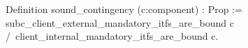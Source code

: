 Definition sound_contingency (c:component) : Prop := 
       subc_client_external_mandatory_itfs_are_bound c /\
       client_internal_mandatory_itfs_are_bound c.
